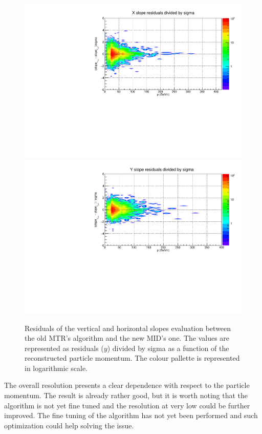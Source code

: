 \begin{figure}[!h]
\begin{center}
\includegraphics[width=0.99\linewidth]{Chapters/O2/Figs/TRmx_sigma.pdf}
\includegraphics[width=0.99\linewidth]{Chapters/O2/Figs/TRmy_sigma.pdf}
\caption{Residuals of the vertical and horizontal slopes evaluation between the old MTR's algorithm and the new MID's one. The values are represented as residuals ($y$) divided by sigma as a function of the reconstructed particle momentum. The colour pallette is represented in logarithmic scale.}
\label{fig:MID_TRm}
\end{center}
\end{figure}

The overall resolution presents a clear dependence with respect to the particle momentum.
The result is already rather good, but it is worth noting that the algorithm is not yet fine tuned and the resolution at very low \pt could be further improved.
The fine tuning of the algorithm has not yet been performed and such optimization could help solving the issue.


